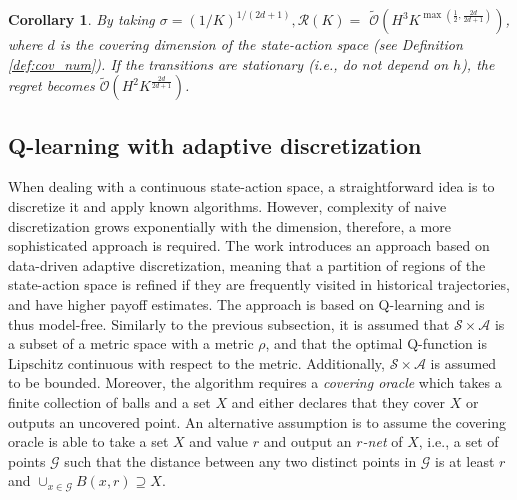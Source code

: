 \documentclass{article}
\numberwithin{equation}{section}
\newtheorem{corollary}{Corollary}
\newcommand{\cA}{\mathcal{A}}
\newcommand{\cS}{\mathcal{S}}
\begin{document}
\begin{corollary}
By taking $\sigma=(1 / K)^{1 /(2 d+1)}, \mathcal{R}(K)=$ $\widetilde{\mathcal{O}}\left(H^3 K^{\max \left(\frac{1}{2}, \frac{2 d}{2 d+1}\right)}\right)$, where $d$ is the covering dimension of the state-action space (see Definition \ref{def:cov_num}). If the transitions are stationary (i.e., do not depend on $h$), the regret becomes $\widetilde{\mathcal{O}}\left(H^2 K^{\frac{2 d}{2 d+1}}\right)$.
\end{corollary}



\subsection{Q-learning with adaptive discretization}
When dealing with a continuous state-action space, a straightforward idea is to discretize it and apply known algorithms. However, complexity of naive discretization grows exponentially with the dimension, therefore, a more sophisticated approach is required. The work \citep{sinclair2019adaptive} introduces an approach based on data-driven adaptive discretization, meaning that a partition of regions of the state-action space is refined if they are frequently visited in historical trajectories, and have higher payoff estimates. The approach is based on Q-learning and is thus model-free. Similarly to the previous subsection, it is assumed that \(\cS \times \cA \) is a subset of a metric space with a metric \(\rho\), and that the optimal Q-function is Lipschitz continuous with respect to the metric. Additionally, \(\cS \times \cA \) is assumed to be bounded. Moreover, the algorithm requires a \textit{covering oracle} which takes a finite collection of balls and a set $X$ and either declares that they cover $X$ or outputs
an uncovered point. An alternative assumption is to assume the covering oracle is able to take a set $X$ and value $r$ and output an $r$\textit{-net} of $X$, i.e., a set of points $\mathcal{G}$ such that the distance between any two distinct points in $\mathcal{G}$ is at least $r$ and $\cup_{x \in \mathcal{G}} B(x, r) \supseteq X$.
\end{document}
